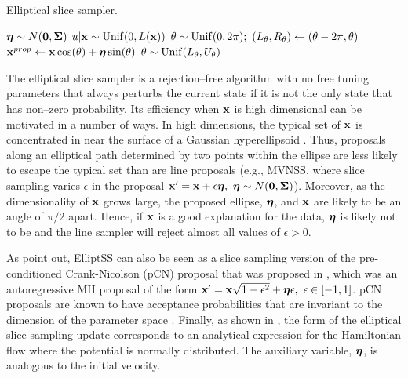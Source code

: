 \begin{algorithm}[htbp]
	\caption{Elliptical slice sampler.}\label{alg:elliptical_slice_sampler}
	\begin{algorithmic}[1]
		\State $ \boldsymbol{\eta} \sim N(\boldsymbol{0}, \boldsymbol{\Sigma}) $ 
		\State $ u|\mathbf{x} \sim \mathrm{Unif}(0, L(\mathbf{x})) $ 
		\State $\theta \sim \mr{Unif}(0,2\pi);\ 
		(L_{\theta}, R_\theta) \gets (\theta - 2\pi, \theta)$ 
		\State $ \mathbf{x} ^{prop}\gets\mathbf{x}\cos(\theta) + \boldsymbol{\eta}\sin(\theta) $ 
		\If{$ L(\prop{\bx}) > u $}{ $ \new{\bx}\gets\prop{\bx} $}\Comment{Accept proposal}
		\State\Return{ $ \new{\bx} $}
		\Else{}
		\EndIf
		\State $ \theta\sim\mathrm{Unif}(L_\theta,U_\theta) $ 
		\State{\textbf{GoTo} 5} 
		\EndIf
		\EndProcedure
	\end{algorithmic}
\end{algorithm}

The elliptical slice sampler is a rejection--free algorithm with no free tuning parameters that always perturbs the current state if it is not the only state that has non--zero probability. Its efficiency when $ \mathbf{x} $ is high dimensional can be motivated in a number of ways. In high dimensions, the typical set of $ \mathbf{x} $ is concentrated in near the surface of a Gaussian hyperellipsoid \cite{betancourt2017conceptual,murray2010}. Thus, proposals along an elliptical path determined by two points within the ellipse are less likely to escape the typical set than are line proposals (e.g., MVNSS, where slice sampling varies $ \epsilon $ in the proposal $ \bx' = \bx + \epsilon\boeta,\ \boeta \sim N(\bs{0},\bSigma)$). Moreover, as the dimensionality of $ \mathbf{x} $ grows large, the proposed ellipse, $ \boldsymbol{\eta} $, and $ \mathbf{x} $ are likely to be an angle of $ \pi/2 $ apart. Hence, if $ \mathbf{x} $ is a good explanation for the data, $ \boldsymbol{\eta} $ is likely not to be and the line sampler will reject almost all values of $ \epsilon>0 $. 

As  \cite{murray2010} point out, ElliptSS can also be seen as a slice sampling version of the pre-conditioned Crank-Nicolson (pCN) proposal that was proposed in \cite{neal1998regression}, which was an autoregressive MH proposal of the form  $ \mathbf{x}' = \mathbf{x}\sqrt{1-\epsilon^2} + \boldsymbol{\eta}\epsilon,\ \epsilon\in[-1,1] $. pCN proposals are known to have acceptance probabilities that are invariant to the dimension of the parameter space \cite{cotter2013mcmc}. Finally, as shown in \cite{bloem2016slice}, the form of the elliptical slice sampling update corresponds to an analytical expression for the Hamiltonian flow where the potential  is normally distributed. The auxiliary variable, $ \boldsymbol{\eta} $, is analogous to the initial velocity. 

